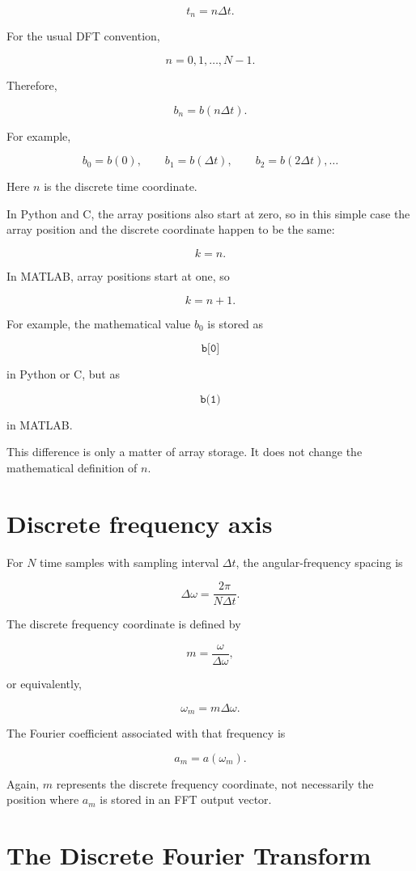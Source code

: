 \documentclass[11pt]{article}
\begin{document}
\[
t_n=n\Delta t.
\]

For the usual DFT convention,

\[
n=0,1,\ldots,N-1.
\]

Therefore,

\[
b_n=b(n\Delta t).
\]

For example,

\[
b_0=b(0),
\qquad
b_1=b(\Delta t),
\qquad
b_2=b(2\Delta t),
\ldots
\]

Here $n$ is the discrete time coordinate.

In Python and C, the array positions also start at zero, so in this simple
case the array position and the discrete coordinate happen to be the same:

\[
k=n.
\]

In MATLAB, array positions start at one, so

\[
k=n+1.
\]

For example, the mathematical value $b_0$ is stored as

\[
\texttt{b[0]}
\]

in Python or C, but as

\[
\texttt{b(1)}
\]

in MATLAB.

This difference is only a matter of array storage. It does not change the
mathematical definition of $n$.

\section*{Discrete frequency axis}

For $N$ time samples with sampling interval $\Delta t$, the angular-frequency
spacing is

\[
\Delta\omega
=
\frac{2\pi}{N\Delta t}.
\]

The discrete frequency coordinate is defined by

\[
m=\frac{\omega}{\Delta\omega},
\]

or equivalently,

\[
\omega_m=m\Delta\omega.
\]

The Fourier coefficient associated with that frequency is

\[
a_m=a(\omega_m).
\]

Again, $m$ represents the discrete frequency coordinate, not necessarily
the position where $a_m$ is stored in an FFT output vector.

\section*{The Discrete Fourier Transform}
\end{document}
